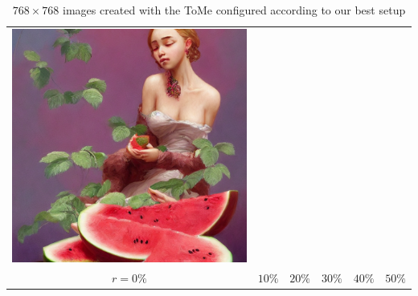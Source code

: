 \begin{table}[!htb]
\begin{tabular}{c c@{}c@{}c@{}c@{}c}
    \includegraphics[width=0.155\linewidth]{chapter/appendix/def_imgs/melon/m_50.png} \\
    \(r=0\%\) & \(10\%\) & \(20\%\) & \(30\%\) & \(40\%\) & \(50\%\) \\
\end{tabular}
\caption{$768 \times 768$ images created with the ToMe configured according to our best setup}
\end{table}